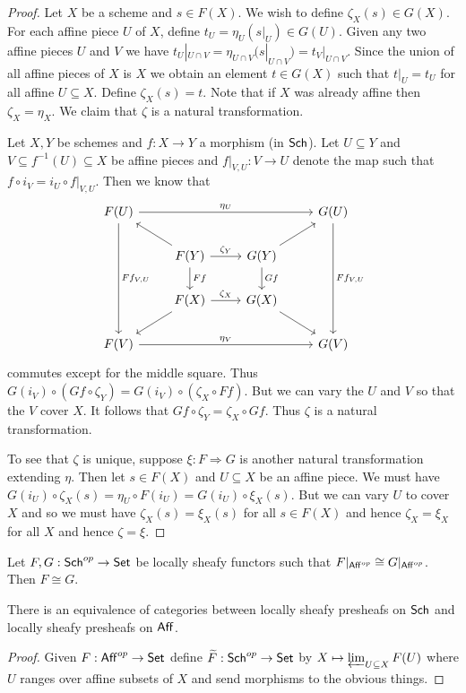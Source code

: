 \documentclass{memoir}
\begin{document}
\begin{proof}
    Let $X$ be a scheme and $s\in F(X)$.
    We wish to define $\zeta_X(s)\in G(X)$.
    For each affine piece $U$ of $X$, define $t_U = \eta_{U}(s|_{U})\in G(U)$.
    Given any two affine pieces $U$ and $V$ we have $t_U|_{U\cap V} = \eta_{U\cap V}(s|_{U\cap V}) = t_V|_{U\cap V}$.
    Since the union of all affine pieces of $X$ is $X$ we obtain an element $t\in G(X)$ such that $t|_U = t_U$ for all affine $U\subseteq X$.
    Define $\zeta_X(s) = t$.
    Note that if $X$ was already affine then $\zeta_X = \eta_X$.
    We claim that $\zeta$ is a natural transformation.
    
    Let $X,Y$ be schemes and $f:X\to Y$ a morphism (in ${\normalfont\mathsf{Sch}}$).
    Let $U\subseteq Y$ and $V\subseteq f^{-1}(U)\subseteq X$ be affine pieces and $f|_{V,U}:V\to U$ denote the map such that $f \circ i_V = i_U \circ f|_{V,U}$.
    Then we know that 
    \begin{equation}
        \begin{tikzcd}
            F(U) \arrow[rrr,"\eta_U"] \arrow[ddd,"Ff_{V,U}"] & & & G(U) \arrow[ddd,"Ff_{V,U}"] \\
                                         & F(Y) \arrow[r,"\zeta_Y"] \arrow[ul] \arrow[d,"Ff"] & G(Y) \arrow[d,"Gf"] \arrow[ur] & \\
                                        & F(X) \arrow[r,"\zeta_X"] \arrow[dl] & G(X) \arrow[dr] & \\
            F(V) \arrow[rrr,"\eta_V"] & & & G(V)
        \end{tikzcd}
    \end{equation}
    commutes except for the middle square.
    Thus $G(i_V) \circ (Gf \circ \zeta_Y) = G(i_V) \circ (\zeta_X \circ Ff)$.
    But we can vary the $U$ and $V$ so that the $V$ cover $X$.
    It follows that $Gf \circ \zeta_Y = \zeta_X \circ Gf$.
    Thus $\zeta$ is a natural transformation.

    To see that $\zeta$ is unique, suppose $\xi:F\Rightarrow G$ is another natural transformation extending $\eta$.
    Then let $s\in F(X)$ and $U\subseteq X$ be an affine piece.
    We must have $G(i_U) \circ \zeta_X(s) = \eta_U \circ F(i_U) = G(i_U) \circ \xi_X(s)$.
    But we can vary $U$ to cover $X$ and so we must have $\zeta_X(s) = \xi_X(s)$ for all $s\in F(X)$ and hence $\zeta_X = \xi_X$ for all $X$ and hence $\zeta = \xi$.
\end{proof}
\begin{corollary}
    Let $F,G:{\normalfont\mathsf{Sch}}^{op}\to {\normalfont\mathsf{Set}}$ be locally sheafy functors such that $F|_{{\normalfont\mathsf{Aff}}^{op}} \cong G|_{{\normalfont\mathsf{Aff}}^{op}}$.
    Then $F\cong G$.
\end{corollary}
\begin{conjecture}
    There is an equivalence of categories between locally sheafy presheafs on ${\normalfont\mathsf{Sch}}$ and locally sheafy presheafs on ${\normalfont\mathsf{Aff}}$.
\end{conjecture}
\begin{proof}
    Given $F:{\normalfont\mathsf{Aff}}^{op}\to {\normalfont\mathsf{Set}}$ define $\widetilde F:{\normalfont\mathsf{Sch}}^{op}\to {\normalfont\mathsf{Set}}$ by $X\mapsto \varprojlim_{U\subseteq X}F(U)$ where $U$ ranges over affine subsets of $X$ and send morphisms to the obvious things.
\end{proof}
\end{document}
